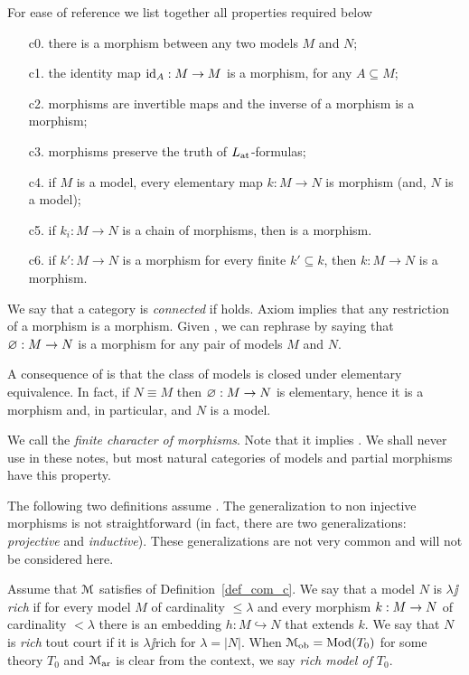 \documentclass[creche.tex]{subfiles}
\begin{document}
\begin{definition}\label{def_com_c}For ease of reference we list together all properties required below
\begin{itemize} 
\item[c0.] there is a morphism between any two models $M$ and $N$;
\item[c1.] the identity map $\textrm{id}_A:M\to M$ is a morphism, for any $A\subseteq M$;
\item[c2.] morphisms are invertible maps and the inverse of a morphism is a morphism;
\item[c3.] morphisms preserve the truth of $L_{\tiny\rm at}\hskip-.3ex$\,-formulas;
\item[c4.] if $M$ is a model, every elementary map $k:M\to N$ is morphism (and, $N$ is a model);
\item[c5.] if $k_i:M\to N$ is a chain of morphisms, then  is a morphism.
\item[c6.] if $k':M\to N$ is a morphism for every finite $k'\subseteq k$, then $k:M\to N$ is a morphism.\QED
\end{itemize}
\end{definition}
 
We say that a category is \emph{connected\/} if  holds. Axiom  implies that any restriction of a morphism is a morphism. Given , we can rephrase  by saying that $\varnothing:M\to N$ is a morphism for any pair of models $M$ and $N$.

A consequence of  is that the class of models is closed under elementary equivalence. In fact, if $N\equiv M$ then $\varnothing:M\to N$ is elementary, hence it is a morphism and, in particular, and $N$ is a model. 

We call  the \emph{finite character of morphisms}. Note that it implies . We shall never use  in these notes, but most natural categories of models and partial morphisms have this property.

The following two definitions assume . The generalization to non injective morphisms is not straightforward (in fact, there are two generalizations: \textit{projective\/} and \textit{inductive\/}). These generalizations are not very common and will not be considered here. 

\begin{definition}
Assume that $\EuScript M$ satisfies  of Definition~\ref{def_com_c}. We say that a model $N$ is \emph{$\lambda\jj$rich\/} if for every model $M$ of cardinality $\le\lambda$ and every morphism $k:M\rightarrow N$ of cardinality $<\lambda$ there is an embedding $h:M\hookrightarrow N$ that extends $k$. We say that $N$ is \emph{rich\/} tout court  if it is $\lambda\jj$rich for $\lambda=|N|$. When $\EuScript M_{\rm ob}=\mathop{\rm Mod}(T_0)$ for some theory $T_0$ and $\EuScript M_{\rm ar}$ is clear from the context, we say \emph{rich model of $T_0$}.\QED
\end{definition}
\end{document}
